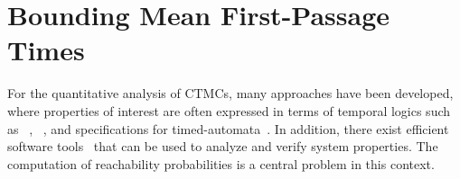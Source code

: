 \chapter{Bounding Mean First-Passage Times}\label{ch:MFPT}







For the quantitative analysis of \acp{CTMC}, many   approaches have been
developed, where properties of interest are often expressed in terms of temporal logics such as
~\parencite{aziz1996verifying,baier2000model,baier2003model,spieler2014model},
~\parencite{chen2011time},
and specifications for timed-automata~\parencite{chen2009quantitative,mikeev2013fly}.
In addition, there exist
efficient software
tools~\parencite{hinton2006prism,kwiatkowska2011prism,dehnert2017storm}
that can be used to analyze and verify system properties.
The computation of reachability probabilities is a central problem in this context.

